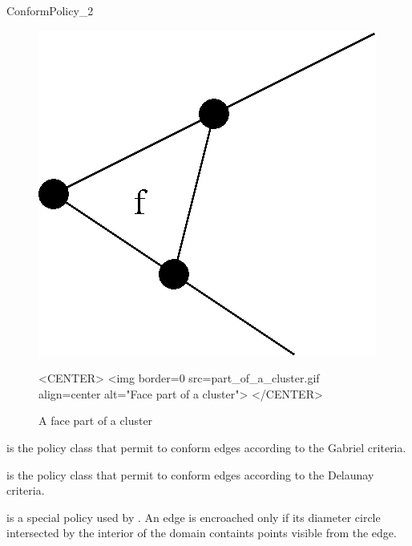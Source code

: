 \begin{ccRefConcept}{ConformPolicy_2}
\begin{figure}
\begin{ccTexOnly}
\begin{center}
\includegraphics{Mesh_2_ref/part_of_a_cluster.eps}
\end{center}
\end{ccTexOnly}
\caption{A face part of a cluster}
\label{part_of_a_cluster}
\begin{ccHtmlOnly}
<CENTER>
<img border=0 src=part_of_a_cluster.gif align=center alt="Face part of
a cluster">
</CENTER>
\end{ccHtmlOnly}
\end{figure}


\ccCreation
{}



\ccHasModels
{} is the policy class that permit to
conform edges according to the Gabriel criteria.

 is the policy class that permit to
conform edges according to the Delaunay criteria.

 is a special policy used by
. An edge is encroached only if its diameter circle
intersected by the interior of the domain containts points visible
from the edge.




\end{ccRefConcept}
